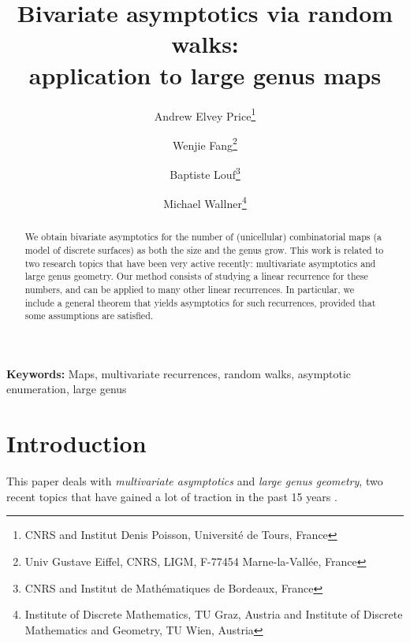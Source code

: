 \documentclass[a4paper,12pt]{article}
\theoremstyle{definition}
\providecommand{\keywords}[1]
{
  \small	
  \noindent
  \textbf{{Keywords:}} #1
}
\begin{document}
\title{\textbf{Bivariate asymptotics via random walks: \\application to large genus maps}}

\author{%
  Andrew Elvey Price\thanks{CNRS and Institut Denis Poisson, Université de Tours, France}
  \and
  Wenjie Fang\thanks{Univ Gustave Eiffel, CNRS, LIGM, F-77454 Marne-la-Vallée, France}
  \and
  Baptiste Louf\thanks{CNRS and Institut de Mathématiques de Bordeaux, France}
  \and
  Michael Wallner\thanks{Institute of Discrete Mathematics, TU Graz, Austria and Institute of Discrete Mathematics and Geometry, TU Wien, Austria} 
}


\maketitle

\begin{abstract}
  We obtain bivariate asymptotics for the number of (unicellular) combinatorial maps (a model of discrete surfaces) as both the size and the genus grow. This work is related to two research topics that have been very active recently: multivariate asymptotics and large genus geometry.  
  Our method consists of studying a linear recurrence for these numbers, and can be applied to many other linear recurrences. In particular, we include a general theorem that yields asymptotics for such recurrences, provided that some assumptions are satisfied.
  \thispagestyle{empty}
\end{abstract}

\keywords{Maps, multivariate recurrences, random walks, asymptotic enumeration, large genus}


\section{Introduction} \label{sec:intro}

This paper deals with \emph{multivariate asymptotics} and \emph{large genus geometry}, two recent topics that have gained a lot of traction in the past 15 years \cite{Agg,linear-genus,budzinski-louf,DGZZ,acsv_web}.
\end{document}
